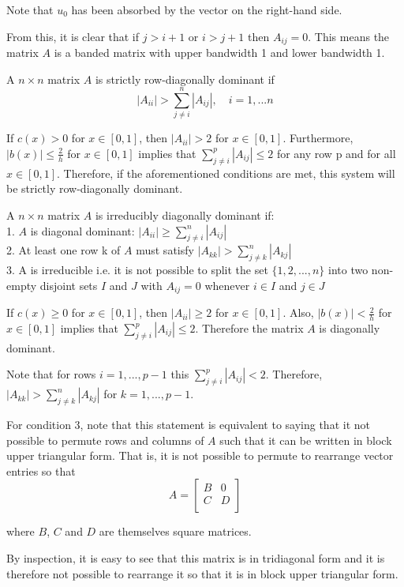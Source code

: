 \documentclass[12pt]{article}
\begin{document}
Note that $u_0$ has been absorbed by the vector on the right-hand side.

From this, it is clear that if $j > i+1$ or $i > j+1$ then $A_{ij}=0$. This means the matrix $A$ is a banded matrix with upper bandwidth 1 and lower bandwidth 1.

A $n\times n$ matrix $A$ is strictly row-diagonally dominant if 
$$|A_{ii}| > \sum_{j \neq i}^{n} |A_{ij}|, \quad  i = 1,...n$$

If $c(x)>0$ for $x \in [0,1]$, then $|A_{ii}| > 2$ for $x \in [0,1]$. Furthermore, $|b(x)| \leq \frac{2}{h}$ for $x \in [0,1]$ implies that $\sum_{j \neq i}^{p} |A_{ij}| \leq 2$ for any row p and for all $x \in [0,1]$. Therefore, if the aforementioned conditions are met, this system will be strictly row-diagonally dominant.

A $n\times n$ matrix $A$ is irreducibly diagonally dominant if: \\
1. $A$ is diagonal dominant: $|A_{ii}| \geq \sum_{j \neq i}^{n} |A_{ij}|$ \\
2. At least one row k of $A$ must satisfy $|A_{kk}| > \sum_{j \neq k}^{n} |A_{kj}|$ \\
3. A is irreducible i.e. it is not possible to split the set $\{1, 2,..., n\}$ into two non-empty disjoint sets $I$ and $J$ with $A_{ij} = 0 $ whenever $i \in I$ and $j \in J$

If $c(x) \geq 0$ for $x \in [0,1]$, then $|A_{ii}| \geq 2$ for $x \in [0,1]$. Also,  $|b(x)| < \frac{2}{h}$ for $x \in [0,1]$ implies that $\sum_{j \neq i}^{p} |A_{ij}| \leq 2$. Therefore the matrix $A$ is diagonally dominant.

Note that for rows $i = 1,...,p-1$ this $\sum_{j \neq i}^{p} |A_{ij}| < 2$. Therefore, $|A_{kk}| > \sum_{j \neq k}^{n} |A_{kj}|$ for $k = 1, ..., p-1$.

For condition 3, note that this statement is equivalent to saying that it not possible to permute rows and columns of $A$ such that it can be written in block upper triangular form. That is, it is not possible to permute to rearrange vector entries so that
$$ A = \begin{bmatrix}
B & 0 \\
C & D \\
\end{bmatrix}$$

where $B$, $C$ and $D$ are themselves square matrices. 

By inspection, it is easy to see that this matrix is in tridiagonal form and it is therefore not possible to rearrange it so that it is in block upper triangular form.
\end{document}
